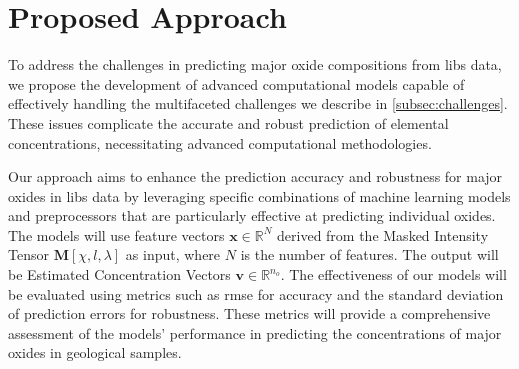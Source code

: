\section{Proposed Approach}
To address the challenges in predicting major oxide compositions from \gls{libs} data, we propose the development of advanced computational models capable of effectively handling the multifaceted challenges we describe in \ref{subsec:challenges}.
These issues complicate the accurate and robust prediction of elemental concentrations, necessitating advanced computational methodologies. 

Our approach aims to enhance the prediction accuracy and robustness for major oxides in \gls{libs} data by leveraging specific combinations of machine learning models and preprocessors that are particularly effective at predicting individual oxides.
The models will use feature vectors $\mathbf{x} \in \mathbb{R}^N$ derived from the Masked Intensity Tensor $\mathbf{M}[\chi, l, \lambda]$ as input, where $N$ is the number of features. 
The output will be Estimated Concentration Vectors $\mathbf{v} \in \mathbb{R}^{n_o}$.
The effectiveness of our models will be evaluated using metrics such as \gls{rmse} for accuracy and the standard deviation of prediction errors for robustness.
These metrics will provide a comprehensive assessment of the models' performance in predicting the concentrations of major oxides in geological samples.


